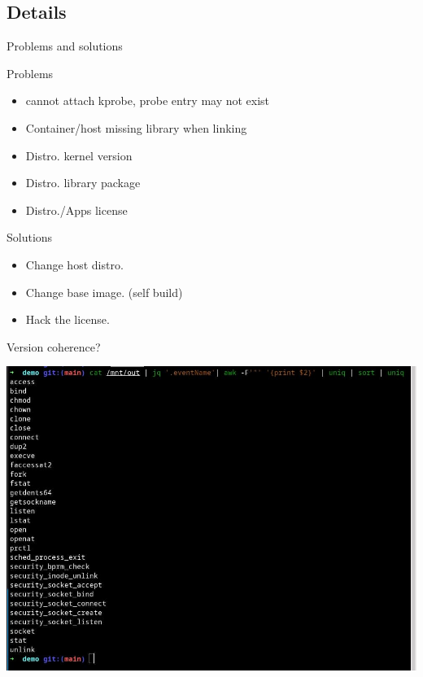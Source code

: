 \documentclass{beamer}
\begin{document}
\begin{CJK*}{UTF8}{bsmi}
  \section{Details}
  \begin{frame}{Problems and solutions}
    \begin{multicols*}{2}
      \begin{block}{Problems}
        \begin{itemize}
          \item cannot attach kprobe, probe entry may not exist
          \item Container/host missing library when linking
          \item Distro. kernel version
          \item Distro. library package
          \item Distro./Apps license
        \end{itemize}  
      \end{block}
      
      \begin{example}{Solutions}
        \begin{itemize}
          \item Change host distro.
          \item Change base image. (self build)
          \item Hack the license.
        \end{itemize}
      \end{example}
    \end{multicols*}
    Version coherence?
  \end{frame}

  \begin{frame}
    \includegraphics[width=\textwidth]{photo_2021-08-17_07-35-49.jpg}
  \end{frame}


\end{CJK*}
\end{document}
